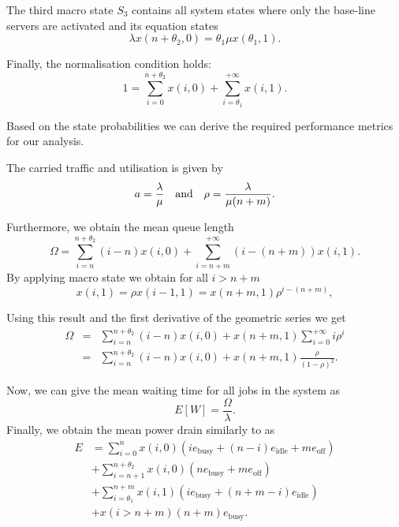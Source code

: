 The third macro state \(S_3\) contains all system states where only the base-line servers are activated and its equation states
\begin{equation}
\lambda x(n+\theta_2,0) = \theta_1\mu x(\theta_1,1)\label{eq:cloud:data_centers:modeling:energy_efficient:S3}.
\end{equation}

Finally, the normalisation condition holds:
\begin{equation}
1=\sum_{i=0}^{n+\theta_2} x(i,0)+\sum_{i=\theta_1}^{+\infty}x(i,1).\label{eq:cloud:data_centers:modeling:normative}
\end{equation}

Based on the state probabilities we can derive the required performance metrics for our analysis.

The carried traffic and utilisation is given by
\begin{equation*}
a = \frac{\lambda}{\mu} \text{\quad and\quad} \rho=\frac{\lambda}{\mu(n+m)}.
\end{equation*}

Furthermore, we obtain the mean queue length
\begin{equation*}
\Omega = \sum_{i=n}^{n+\theta_2} (i-n)x(i,0) + \sum_{i=n+m}^{+\infty} (i-(n+m))x(i,1).
\end{equation*}
By applying macro state  we obtain for all \(i>n+m\)
\begin{equation}
x(i,1) = \rho x(i-1,1) = x(n + m,1)\rho^{i-(n+m)},
\label{eq:cloud:data_centers:modeling:x_i_redefinition}
\end{equation} 

Using this result and the first derivative of the geometric series we get 
\begin{eqnarray*}
\Omega &=& \sum_{i=n}^{n+\theta_2} (i-n)x(i,0) + x(n+m,1)\sum_{i=0}^{+\infty} i\rho^i\nonumber\\
&=& \sum_{i=n}^{n+\theta_2} (i-n)x(i,0) + x(n+m,1)\frac{\rho}{(1-\rho)^2}.
\end{eqnarray*}

Now, we can give the mean waiting time for all jobs in the system as
\begin{equation*}
E[W] = \frac{\Omega}{\lambda}.
\end{equation*}
Finally, we obtain the mean power drain similarly to  as
\begin{align*}
E& = \sum_{i=0}^{n} x(i,0)(i e_\text{busy} + (n-i)e_\text{idle} + m e_\text{off})\\
&+ \sum_{i=n+1}^{n+\theta_2} x(i,0)(ne_\text{busy}+me_\text{off})\nonumber\\
&+\sum_{i=\theta_1}^{n+m} x(i,1)(i e_\text{busy} + (n+m-i)e_\text{idle})\nonumber\\
&+x(i > n+m)(n+m)e_\text{busy}.\nonumber
\end{align*}
